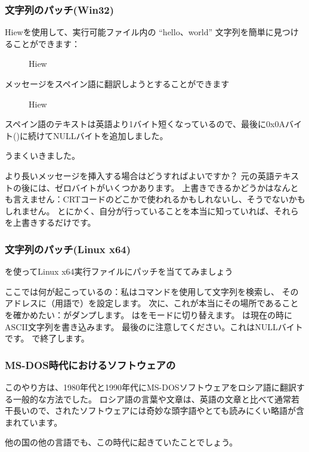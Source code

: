 \subsubsection{文字列のパッチ(Win32)}

Hiewを使用して、実行可能ファイル内の ``hello、world'' 文字列を簡単に見つけることができます：

\begin{figure}[H]
\centering
{}
\caption{Hiew}
\label{}
\end{figure}

メッセージをスペイン語に翻訳しようとすることができます

\begin{figure}[H]
\centering
{}
\caption{Hiew}
\label{}
\end{figure}

スペイン語のテキストは英語より1バイト短くなっているので、最後に0x0Aバイト()に続けてNULLバイトを追加しました。

うまくいきました。

より長いメッセージを挿入する場合はどうすればよいですか？
元の英語テキストの後には、ゼロバイトがいくつかあります。 上書きできるかどうかはなんとも言えません：\ac{CRT}コードのどこかで使われるかもしれないし、そうでないかもしれません。 
とにかく、自分が行っていることを本当に知っていれば、それらを上書きするだけです。

\subsubsection{文字列のパッチ(Linux x64)}

\myindex{\radare}
\radare{}を使ってLinux x64実行ファイルにパッチを当ててみましょう



ここでは何が起こっているの：私は\TT{/}コマンドを使用して文字列を検索し、
そのアドレスに（\radare{}用語で）を設定します。 
次に、これが本当にその場所であることを確かめたい：がダンプします。
は\radare{}をモードに切り替えます。 
は現在の時にASCII文字列を書き込みます。
最後のに注意してください。これはNULLバイトです。
で終了します。

\subsubsection{MS-DOS時代におけるソフトウェアの}

このやり方は、1980年代と1990年代にMS-DOSソフトウェアをロシア語に翻訳する一般的な方法でした。 ロシア語の言葉や文章は、英語の文章と比べて通常若干長いので、されたソフトウェアには奇妙な頭字語やとても読みにくい略語が含まれています。

他の国の他の言語でも、この時代に起きていたことでしょう。
